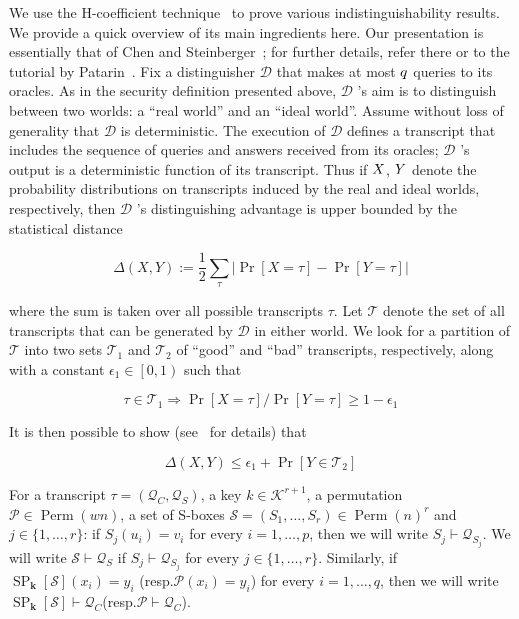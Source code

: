 We use the H-coefficient technique~\cite{SAC:Patarin08,EC:CheSte14} to prove various indistinguishability results. We provide a quick overview of its main ingredients here. Our presentation is essentially that of Chen and Steinberger~\cite{EC:CheSte14}; for further details, refer there or to the tutorial by Patarin~\cite{SAC:Patarin08}.
  Fix a distinguisher $\mathcal{D}$  that makes at most $\mathnormal{q}$ queries to its oracles. As in the security definition presented above, $\mathcal{D}$ 's  aim is to distinguish between two
worlds: a ``real world'' and an ``ideal world''. Assume without loss of generality that $\mathcal{D}$ is deterministic. The execution of $\mathcal{D}$  defines a transcript that includes the sequence of queries and answers received from its oracles; $\mathcal{D}$ 's output is a deterministic function of its transcript. Thus if $\mathnormal{X}$, $\mathnormal{Y}$ denote the probability distributions on transcripts induced by the real and ideal worlds, respectively, then $\mathcal{D}$ 's distinguishing advantage is upper bounded by the statistical distance

$$
\Delta(X, Y):=\frac{1}{2} \sum_{\tau}|\operatorname{Pr}[X=\tau]-\operatorname{Pr}[Y=\tau]|
$$

where the sum is taken over all possible transcripts $\tau$.
Let $\mathcal{T}$ denote the set of all transcripts that can be generated by $\mathcal{D}$ in either world. We look for a partition of $\mathcal{T}$  into two sets $\mathcal{T}_{1}$ and $\mathcal{T}_2$ of ``good'' and ``bad'' transcripts, respectively, along with a constant $\epsilon_{1} \in \left[0,1\right)$ such that

$$
\tau \in \mathcal{T}_{1} \Longrightarrow \operatorname{Pr}[X=\tau] / \operatorname{Pr}[Y=\tau] \geq 1-\epsilon_{1}
$$

It is then possible to show (see~\cite{EC:CheSte14} for details) that

$$
\Delta(X, Y) \leq \epsilon_{1}+\operatorname{Pr}\left[Y \in \mathcal{T}_{2}\right]
$$

For a transcript $\tau=\left(\mathcal{Q}_{C}, \mathcal{Q}_{S}\right)$, a key $k \in \mathcal{K}^{r+1}$, a permutation $\mathcal{P} \in \operatorname{Perm}( w n)$, a set of S-boxes $\mathcal{S} =\left(S_{1}, \ldots, S_{r}\right) \in \operatorname{Perm}( n)^{r}$ and $j \in \{1, \ldots, r\}$: if $S_{j}(u_{i})=v_{i}$ for every $i=1, \ldots, p$, then we will write $S_{j} \vdash \mathcal{Q}_{S_{j}}$. We will write $\mathcal{S} \vdash \mathcal{Q}_{S}$ if $S_{j} \vdash \mathcal{Q}_{S_{j}}$ for every $j \in \{1, \ldots, r\}$. Similarly, if $\operatorname{SP}_{\mathbf{k}}[\mathcal{S}]\left(x_{i}\right)=y_{i}$ (resp.$\mathcal{P}\left(x_{i}\right)=y_{i}$) for every $i=1, \ldots, q$, then we will write $\operatorname{SP}_{\mathbf{k}}[\mathcal{S}] \vdash \mathcal{Q}_{C}$(resp.$\mathcal{P} \vdash \mathcal{Q}_{C}$).\\

